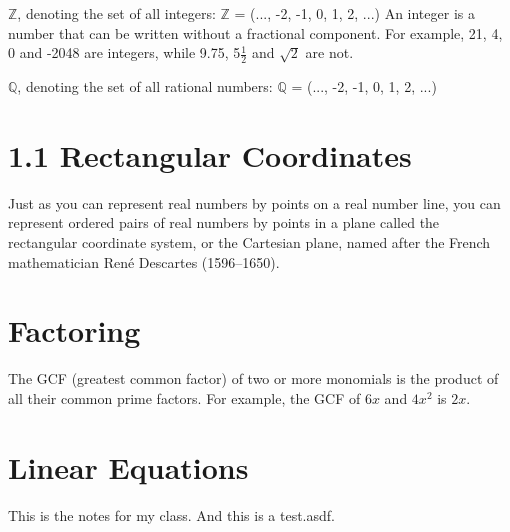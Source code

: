 \documentclass[12pt, letterpaper]{article}
\begin{document}
\noindent$\mathbb{Z}$, denoting the set of all integers: $\mathbb{Z}$ =
(..., -2, -1, 0, 1, 2, ...)
\newline
\newline
An integer is a number that can be written without a fractional component.
For example, 21, 4, 0 and -2048 are integers, while 9.75, 5$\frac{1}{2}$ and $\sqrt{2}$ are not.
\newline
\newline

\noindent$\mathbb{Q}$, denoting the set of all rational numbers: $\mathbb{Q}$ =
(..., -2, -1, 0, 1, 2, ...)
\newline
\newline
\newline
\newline

\section{1.1 Rectangular Coordinates}

Just as you can represent real numbers by points on a real number line, you can
represent ordered pairs of real numbers by points in a plane called the
rectangular coordinate system, or the Cartesian plane, named after the French
mathematician René Descartes (1596–1650).

\section{Factoring}

The GCF (greatest common factor) of two or more monomials is the product of all their common prime factors. For example, the GCF of $6x$ and $4x^2$ is $2x$.

\section{Linear Equations}

This is the notes for my class. And this is a test.asdf.
\end{document}
